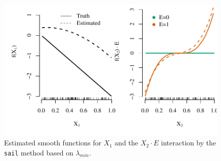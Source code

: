 \documentclass[12pt,letter]{article}\usepackage[]{graphicx}\usepackage[]{color}
\newenvironment{knitrout}{}{} %
\begin{document}
\begin{knitrout}\scriptsize
{}\color{fgcolor}\begin{figure}[H]

{\centering \includegraphics[width=1\linewidth]{figure/toy-effects-1} 

}

\caption[Estimated smooth functions for $X_1$ and the $X_2 \cdot E$ interaction by the \texttt{sail} method based on $\lambda_{min}$]{Estimated smooth functions for $X_1$ and the $X_2 \cdot E$ interaction by the \texttt{sail} method based on $\lambda_{min}$.}\label{fig:toy-effects}
\end{figure}


\end{knitrout}
\end{document}
